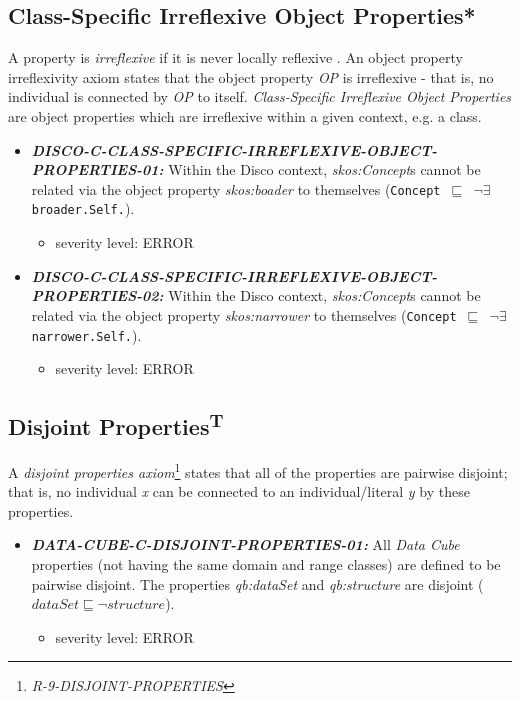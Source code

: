 \documentclass{llncs}
\newcommand{\ms}[1]{\texttt{#1}}
\begin{document}
\subsection{Class-Specific Irreflexive Object Properties*}

A property is \emph{irreflexive} if it is never locally reflexive \cite{Kroetzsch2012}.
An object property irreflexivity axiom states that the object property \emph{OP} is irreflexive - that is, no individual is connected by \emph{OP} to itself.
\emph{Class-Specific Irreflexive Object Properties} are object properties which are irreflexive within a given context, e.g. a class. 

\begin{itemize}
  \item \textbf{{\em DISCO-C-CLASS-SPECIFIC-IRREFLEXIVE-OBJECT-PROPERTIES-01:}}
Within the Disco context, {\em skos:Concept}s cannot be related via the object property {\em skos:boader} to themselves (\ms{Concept $\sqsubseteq$ $\neg$$\exists$ broader.Self.}). 
	\begin{itemize}
		\item severity level: ERROR
	\end{itemize}
	\item \textbf{{\em DISCO-C-CLASS-SPECIFIC-IRREFLEXIVE-OBJECT-PROPERTIES-02:}}
Within the Disco context, {\em skos:Concept}s cannot be related via the object property {\em skos:narrower} to themselves (\ms{Concept $\sqsubseteq$ $\neg$$\exists$ narrower.Self.}). 
	\begin{itemize}
		\item severity level: ERROR
	\end{itemize}
\end{itemize}

\subsection{Disjoint Properties\textsuperscript{T}}

A \emph{disjoint properties axiom}\footnote{\emph{R-9-DISJOINT-PROPERTIES}} states that all of the properties are pairwise disjoint; 
that is, no individual \emph{x} can be connected to an individual/literal \emph{y} by these properties. 

\begin{itemize}
	\item \textbf{{\em DATA-CUBE-C-DISJOINT-PROPERTIES-01:}} 
	All \emph{Data Cube} properties (not having the same domain and range classes) are defined to be pairwise disjoint.
  The properties \emph{qb:dataSet} and \emph{qb:structure} are disjoint ($dataSet \sqsubseteq \neg structure$).
	\begin{itemize}
		\item severity level: ERROR
	\end{itemize}
\end{itemize}
\end{document}
